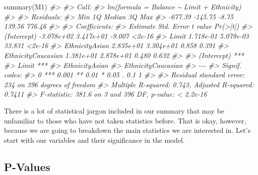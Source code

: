 \documentclass[
]{book}
\newenvironment{Shaded}{\begin{snugshade}}{\end{snugshade}}
\newcommand{\CommentTok}[1]{\textcolor[rgb]{0.56,0.35,0.01}{\textit{#1}}}
\newcommand{\FunctionTok}[1]{\textcolor[rgb]{0.00,0.00,0.00}{#1}}
\newcommand{\NormalTok}[1]{#1}
\begin{document}
\begin{Shaded}
\begin{Highlighting}[]
\FunctionTok{summary}\NormalTok{(M1)}
\CommentTok{\#\textgreater{} }
\CommentTok{\#\textgreater{} Call:}
\CommentTok{\#\textgreater{} lm(formula = Balance \textasciitilde{} Limit + Ethnicity)}
\CommentTok{\#\textgreater{} }
\CommentTok{\#\textgreater{} Residuals:}
\CommentTok{\#\textgreater{}     Min      1Q  Median      3Q     Max }
\CommentTok{\#\textgreater{} {-}677.39 {-}145.75   {-}8.75  139.56  776.46 }
\CommentTok{\#\textgreater{} }
\CommentTok{\#\textgreater{} Coefficients:}
\CommentTok{\#\textgreater{}                      Estimate Std. Error t value Pr(\textgreater{}|t|)}
\CommentTok{\#\textgreater{} (Intercept)        {-}3.078e+02  3.417e+01  {-}9.007   \textless{}2e{-}16}
\CommentTok{\#\textgreater{} Limit               1.718e{-}01  5.079e{-}03  33.831   \textless{}2e{-}16}
\CommentTok{\#\textgreater{} EthnicityAsian      2.835e+01  3.304e+01   0.858    0.391}
\CommentTok{\#\textgreater{} EthnicityCaucasian  1.381e+01  2.878e+01   0.480    0.632}
\CommentTok{\#\textgreater{}                       }
\CommentTok{\#\textgreater{} (Intercept)        ***}
\CommentTok{\#\textgreater{} Limit              ***}
\CommentTok{\#\textgreater{} EthnicityAsian        }
\CommentTok{\#\textgreater{} EthnicityCaucasian    }
\CommentTok{\#\textgreater{} {-}{-}{-}}
\CommentTok{\#\textgreater{} Signif. codes:  }
\CommentTok{\#\textgreater{} 0 \textquotesingle{}***\textquotesingle{} 0.001 \textquotesingle{}**\textquotesingle{} 0.01 \textquotesingle{}*\textquotesingle{} 0.05 \textquotesingle{}.\textquotesingle{} 0.1 \textquotesingle{} \textquotesingle{} 1}
\CommentTok{\#\textgreater{} }
\CommentTok{\#\textgreater{} Residual standard error: 234 on 396 degrees of freedom}
\CommentTok{\#\textgreater{} Multiple R{-}squared:  0.743,  Adjusted R{-}squared:  0.7411 }
\CommentTok{\#\textgreater{} F{-}statistic: 381.6 on 3 and 396 DF,  p{-}value: \textless{} 2.2e{-}16}
\end{Highlighting}
\end{Shaded}

There is a lot of statistical jargon included in our summary that may be unfamiliar to those who have not taken statistics before. That is okay, however, because we are going to breakdown the main statistics we are interested in. Let's start with our variables and their significance in the model.

\hypertarget{p-values}{%
\subsection{P-Values}\label{p-values}}
\end{document}
